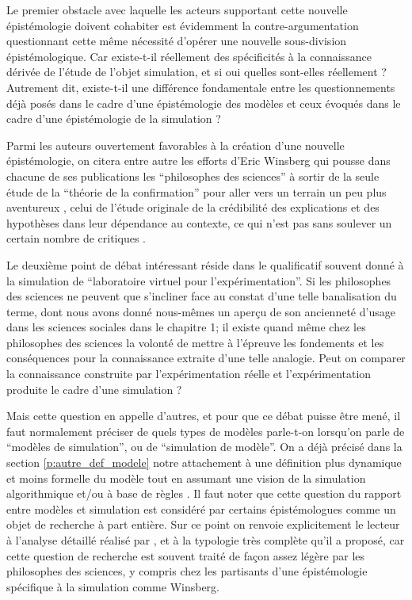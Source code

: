 Le premier obstacle avec laquelle les acteurs supportant cette nouvelle épistémologie doivent cohabiter est évidemment la contre-argumentation questionnant cette même nécessité d'opérer une nouvelle sous-division épistémologique. Car existe-t-il réellement des spécificités à la connaissance dérivée de l'étude de l'objet simulation, et si oui quelles sont-elles réellement ? Autrement dit, existe-t-il une différence fondamentale entre les questionnements déjà posés dans le cadre d'une épistémologie des modèles et ceux évoqués dans le cadre d'une épistémologie de la simulation ?

Parmi les auteurs ouvertement favorables à la création d'une nouvelle épistémologie, on citera entre autre les efforts d'Eric Winsberg \autocites{Winsberg2001, Winsberg2009, Winsberg2013} qui pousse dans chacune de ses publications les \enquote{philosophes des sciences} à sortir de la seule étude de la \enquote{théorie de la confirmation} pour aller vers un terrain un peu plus aventureux , celui de l'étude originale  de la crédibilité des explications et des hypothèses dans leur dépendance au contexte, ce qui n'est pas sans soulever un certain nombre de critiques .

Le deuxième point de débat intéressant réside dans le qualificatif souvent donné à la simulation de \enquote{laboratoire virtuel pour l'expérimentation}. Si les philosophes des sciences ne peuvent que s'incliner face au constat d'une telle banalisation du terme, dont nous avons donné nous-mêmes un aperçu de son ancienneté d'usage dans les sciences sociales dans le chapitre 1; il existe quand même chez les philosophes des sciences la volonté de mettre à l'épreuve les fondements et les conséquences pour la connaissance extraite d'une telle analogie. Peut on comparer la connaissance construite par l'expérimentation réelle et l'expérimentation produite le cadre d'une simulation ? 

Mais cette question en appelle d'autres, et pour que ce débat puisse être mené, il faut normalement préciser de quels types de modèles parle-t-on lorsqu'on parle de \enquote{modèles de simulation}, ou de \enquote{simulation de modèle}. On a déjà précisé dans la section \ref{p:autre_def_modele} notre attachement à une définition plus dynamique et moins formelle du modèle \autocites{Haggett1965,Langlois2005} tout en assumant une vision de la simulation algorithmique et/ou à base de règles \autocite{Varenne2013b}. Il faut noter que cette question du rapport entre modèles et simulation est considéré par certains épistémologues comme un objet de recherche à part entière. Sur ce point on renvoie explicitement le lecteur à l'analyse détaillé réalisé par \textcite{Varenne2013b}, et à la typologie très complète qu'il a proposé, car cette question de recherche est souvent traité de façon assez légère par les philosophes des sciences, y compris chez les partisants d'une épistémologie spécifique à la simulation comme Winsberg.

